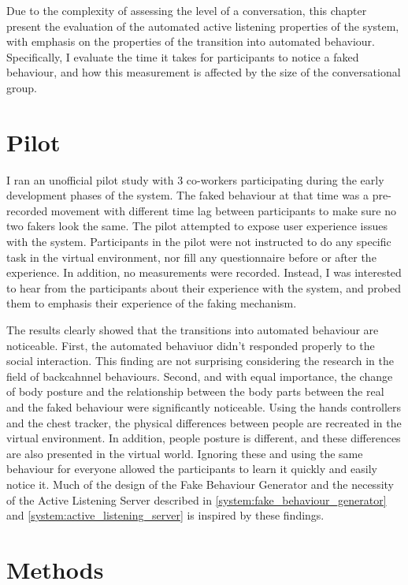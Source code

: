 \documentclass[]{simple-thesis}
\begin{document}
Due to the complexity of assessing the level of a conversation, this chapter present the evaluation of the automated active listening properties of the system, with emphasis on the properties of the transition into automated behaviour.
Specifically, I evaluate the time it takes for participants to notice a faked behaviour, and how this measurement is affected by the size of the conversational group.

\section{Pilot}

I ran an unofficial pilot study with 3 co-workers participating during the early development phases of the system.
The faked behaviour at that time was a pre-recorded movement with different time lag between participants to make sure no two fakers look the same.
The pilot attempted to expose user experience issues with the system.
Participants in the pilot were not instructed to do any specific task in the virtual environment, nor fill any questionnaire before or after the experience.
In addition, no measurements were recorded.
Instead, I was interested to hear from the participants about their experience with the system, and probed them to emphasis their experience of the faking mechanism.

The results clearly showed that the transitions into automated behaviour are noticeable.
First, the automated behaviuor didn't responded properly to the social interaction.
This finding are not surprising considering the research in the field of backcahnnel behaviours.
Second, and with equal importance, the change of body posture and the relationship between the body parts between the real and the faked behaviour were significantly noticeable.
Using the hands controllers and the chest tracker, the physical differences between people are recreated in the virtual environment.
In addition, people posture is different, and these differences are also presented in the virtual world.
Ignoring these and using the same behaviour for everyone allowed the participants to learn it quickly and easily notice it.
Much of the design of the Fake Behaviour Generator and the necessity of the Active Listening Server described in \ref{system:fake_behaviour_generator} and \ref{system:active_listening_server} is inspired by these findings.

\section{Methods}
\end{document}
